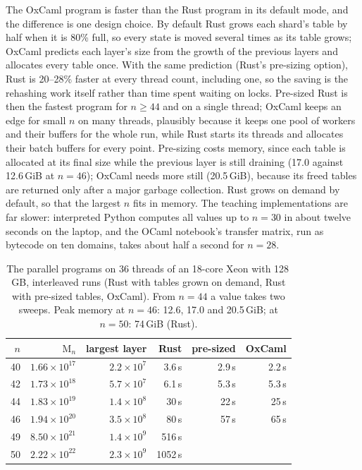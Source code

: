 \documentclass[11pt]{amsart}
\theoremstyle{definition}
\theoremstyle{remark}
\newcommand{\Open}{\mathrm{M}}
\begin{document}
The OxCaml program is faster than the Rust program in its default mode, and the difference is
one design choice. By default Rust grows each shard's table by half when it is 80\% full, so
every state is moved several times as its table grows; OxCaml predicts each layer's size from
the growth of the previous layers and allocates every table once. With the same prediction
(Rust's pre-sizing option), Rust is 20--28\% faster at every thread count, including one, so the
saving is the rehashing work itself rather than time spent waiting on locks. Pre-sized Rust is
then the fastest program for $n \ge 44$ and on a single thread; OxCaml keeps an edge for small
$n$ on many threads, plausibly because it keeps one pool of workers and their buffers for the
whole run, while Rust starts its threads and allocates their batch buffers for every point.
Pre-sizing costs memory, since each table is allocated at its final size while the previous
layer is still draining (17.0 against 12.6\,GiB at $n = 46$); OxCaml needs more still
(20.5\,GiB), because its freed tables are returned only after a major garbage collection. Rust
grows on demand by default, so that the largest $n$ fits in memory. The teaching implementations are far slower:
interpreted Python computes all values up to $n = 30$ in about twelve seconds on the laptop, and the OCaml
notebook's transfer matrix, run as bytecode on ten domains, takes about half a second for
$n = 28$.

\begin{table}[t]
\centering
\begin{tabular}{rrrrrr}
\toprule
$n$ & $\Open_n$ & largest layer & Rust & pre-sized & OxCaml \\
\midrule
40 & $1.66 \times 10^{17}$ & $2.2 \times 10^{7}$ & 3.6\,s & 2.9\,s & 2.2\,s \\
42 & $1.73 \times 10^{18}$ & $5.7 \times 10^{7}$ & 6.1\,s & 5.3\,s & 5.3\,s \\
44 & $1.83 \times 10^{19}$ & $1.4 \times 10^{8}$ & 30\,s & 22\,s & 25\,s \\
46 & $1.94 \times 10^{20}$ & $3.5 \times 10^{8}$ & 80\,s & 57\,s & 65\,s \\
49 & $8.50 \times 10^{21}$ & $1.4 \times 10^{9}$ & 516\,s & & \\
50 & $2.22 \times 10^{22}$ & $2.3 \times 10^{9}$ & 1052\,s & & \\
\bottomrule
\end{tabular}
\caption{The parallel programs on 36 threads of an 18-core Xeon with 128\,GB, interleaved runs
(Rust with tables grown on demand, Rust with pre-sized tables, OxCaml). From $n = 44$ a value
takes two sweeps. Peak memory at $n = 46$: 12.6, 17.0 and 20.5\,GiB; at $n = 50$: 74\,GiB
(Rust).}\label{tab:fast}
\end{table}
\end{document}
